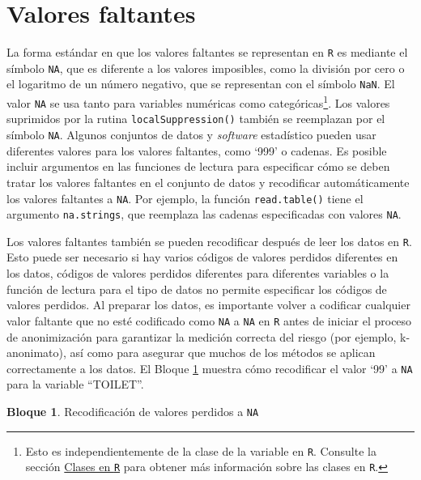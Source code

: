 \documentclass[
]{book}
\theoremstyle{definition}
\theoremstyle{definition}
\newtheorem{example}{Bloque}[chapter]
\theoremstyle{definition}
\theoremstyle{definition}
\theoremstyle{remark}
\begin{document}
\hypertarget{valores-faltantes}{%
\section{Valores faltantes}\label{valores-faltantes}}

La forma estándar en que los valores faltantes se representan en \texttt{R} es mediante el símbolo \texttt{NA}, que es diferente a los valores imposibles, como la división por cero o el logaritmo de un número negativo, que se representan con el símbolo \texttt{NaN}. El valor \texttt{NA} se usa tanto para variables numéricas como categóricas\footnote{Esto es independientemente de la clase de la variable en \texttt{R}. Consulte la sección \protect\hyperlink{clases-en-r}{Clases en \texttt{R}} para obtener más información sobre las clases en \texttt{R}.}. Los valores suprimidos por la rutina \texttt{localSuppression()} también se reemplazan por el símbolo \texttt{NA}. Algunos conjuntos de datos y \emph{software} estadístico pueden usar diferentes valores para los valores faltantes, como `999' o cadenas. Es posible incluir argumentos en las funciones de lectura para especificar cómo se deben tratar los valores faltantes en el conjunto de datos y recodificar automáticamente los valores faltantes a \texttt{NA}. Por ejemplo, la función \texttt{read.table()} tiene el argumento \texttt{na.strings}, que reemplaza las cadenas especificadas con valores \texttt{NA}.

Los valores faltantes también se pueden recodificar después de leer los datos en \texttt{R}. Esto puede ser necesario si hay varios códigos de valores perdidos diferentes en los datos, códigos de valores perdidos diferentes para diferentes variables o la función de lectura para el tipo de datos no permite especificar los códigos de valores perdidos. Al preparar los datos, es importante volver a codificar cualquier valor faltante que no esté codificado como \texttt{NA} a \texttt{NA} en \texttt{R} antes de iniciar el proceso de anonimización para garantizar la medición correcta del riesgo (por ejemplo, k-anonimato), así como para asegurar que muchos de los métodos se aplican correctamente a los datos. El Bloque \ref{exm:bloqueMicro6} muestra cómo recodificar el valor `99' a \texttt{NA} para la variable ``TOILET''.

\begin{example}
\protect\hypertarget{exm:bloqueMicro6}{}\label{exm:bloqueMicro6}Recodificación de valores perdidos a \texttt{NA}
\end{example}
\end{document}
